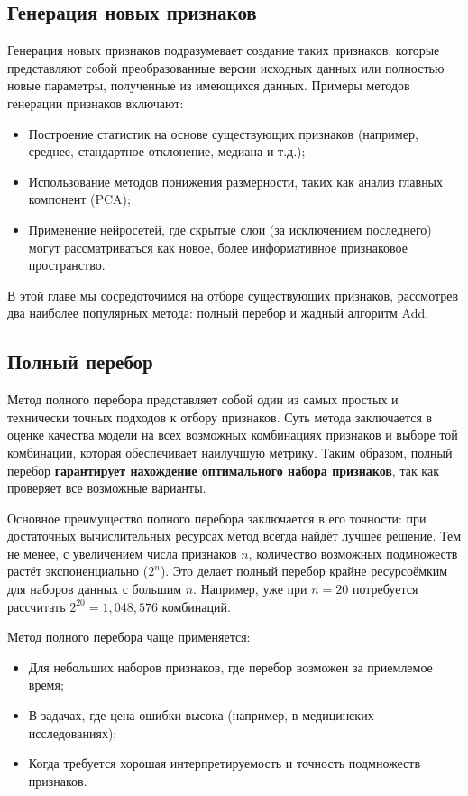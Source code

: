 \subsection{Генерация новых признаков}
Генерация новых признаков подразумевает создание таких признаков, которые представляют собой преобразованные версии исходных данных или полностью новые параметры, полученные из имеющихся данных. Примеры методов генерации признаков включают:

\begin{itemize}
    \item Построение статистик на основе существующих признаков (например, среднее, стандартное отклонение, медиана и т.д.);
    \item Использование методов понижения размерности, таких как анализ главных компонент (PCA);
    \item Применение нейросетей, где скрытые слои (за исключением последнего) могут рассматриваться как новое, более информативное признаковое пространство.
\end{itemize}

В этой главе мы сосредоточимся на отборе существующих признаков, рассмотрев два наиболее популярных метода: полный перебор и жадный алгоритм Add.

\subsection{Полный перебор}

Метод полного перебора представляет собой один из самых простых и технически точных подходов к отбору признаков. Суть метода заключается в оценке качества модели на всех возможных комбинациях признаков и выборе той комбинации, которая обеспечивает наилучшую метрику. Таким образом, полный перебор \textbf{гарантирует нахождение оптимального набора признаков}, так как проверяет все возможные варианты.

Основное преимущество полного перебора заключается в его точности: при достаточных вычислительных ресурсах метод всегда найдёт лучшее решение. Тем не менее, с увеличением числа признаков $n$, количество возможных подмножеств растёт экспоненциально ($2^n$). Это делает полный перебор крайне ресурсоёмким для наборов данных с большим $n$. Например, уже при $n=20$ потребуется рассчитать $2^{20} = 1,048,576$ комбинаций.

Метод полного перебора чаще применяется:
\begin{itemize}
    \item Для небольших наборов признаков, где перебор возможен за приемлемое время;
    \item В задачах, где цена ошибки высока (например, в медицинских исследованиях);
    \item Когда требуется хорошая интерпретируемость и точность подмножеств признаков.
\end{itemize}

